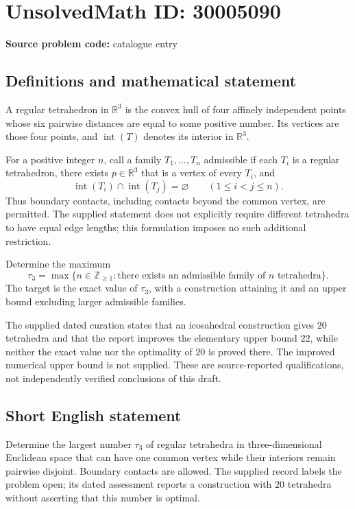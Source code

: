 \documentclass[11pt]{article}
\newcommand{\Z}{\mathbb{Z}}
\newcommand{\R}{\mathbb{R}}
\begin{document}
\section*{UnsolvedMath ID: 30005090}
\textbf{Source problem code:} catalogue entry
\subsection{Definitions and mathematical statement}
A regular tetrahedron in \(\R^3\) is the convex hull of four affinely independent points whose six pairwise distances are equal to some positive number. Its vertices are those four points, and \(\operatorname{int}(T)\) denotes its interior in \(\R^3\).

For a positive integer \(n\), call a family \(T_1,\ldots,T_n\) admissible if each \(T_i\) is a regular tetrahedron, there exists \(p\in\R^3\) that is a vertex of every \(T_i\), and
\[
\operatorname{int}(T_i)\cap\operatorname{int}(T_j)=\varnothing
\qquad(1\leq i<j\leq n).
\]
Thus boundary contacts, including contacts beyond the common vertex, are permitted. The supplied statement does not explicitly require different tetrahedra to have equal edge lengths; this formulation imposes no such additional restriction.

Determine the maximum
\[
\tau_3=\max\bigl\{n\in\Z_{\geq1}:\text{there exists an admissible family of }n\text{ tetrahedra}\bigr\}.
\]
The target is the exact value of \(\tau_3\), with a construction attaining it and an upper bound excluding larger admissible families.

The supplied dated curation states that an icosahedral construction gives \(20\) tetrahedra and that the report improves the elementary upper bound \(22\), while neither the exact value nor the optimality of \(20\) is proved there. The improved numerical upper bound is not supplied. These are source-reported qualifications, not independently verified conclusions of this draft.
\subsection{Short English statement}
Determine the largest number \(\tau_3\) of regular tetrahedra in three-dimensional Euclidean space that can have one common vertex while their interiors remain pairwise disjoint. Boundary contacts are allowed. The supplied record labels the problem open; its dated assessment reports a construction with \(20\) tetrahedra without asserting that this number is optimal.
\end{document}
